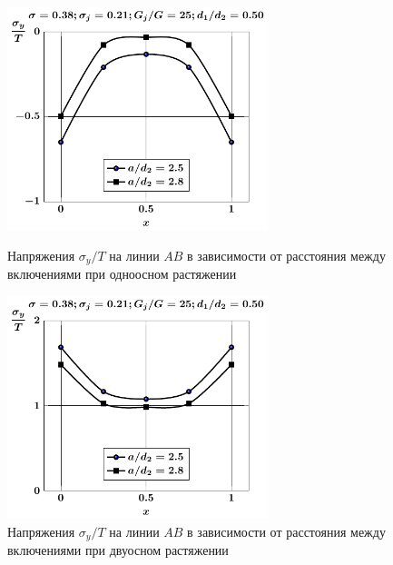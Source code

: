 \begin{figure}[h!]
\centering\footnotesize
\parbox[b]{7.5cm}{\centering\includegraphics[width=7.6cm]{oblate-inc8-a-d50-g25-t1-sig_y.pdf}
\caption{Напряжения $\sigma_y/T$ на линии $AB$ в зависимости от расстояния между включениями при одноосном растяжении
\label{f:10:16}}}\hfil\hfil
\parbox[b]{7.5cm}{\centering\includegraphics[width=7.6cm]{oblate-inc8-a-d50-g25-t2-sig_y.pdf}
\caption{Напряжения $\sigma_y/T$ на линии $AB$ в зависимости от расстояния между включениями при двуосном растяжении
\label{f:10:17}}}
\end{figure}

